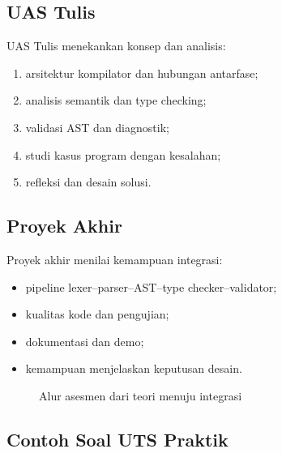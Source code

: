 \subsection{UAS Tulis}

UAS Tulis menekankan konsep dan analisis:
\begin{enumerate}[label=\arabic*.,leftmargin=*]
  \item arsitektur kompilator dan hubungan antarfase;
  \item analisis semantik dan type checking;
  \item validasi AST dan diagnostik;
  \item studi kasus program dengan kesalahan;
  \item refleksi dan desain solusi.
\end{enumerate}

\subsection{Proyek Akhir}

Proyek akhir menilai kemampuan integrasi:
\begin{itemize}[leftmargin=*]
  \item pipeline lexer--parser--AST--type checker--validator;
  \item kualitas kode dan pengujian;
  \item dokumentasi dan demo;
  \item kemampuan menjelaskan keputusan desain.
\end{itemize}

\begin{figure}[H]
\centering
{}
\caption{Alur asesmen dari teori menuju integrasi}
\label{fig:ch17-alur}
\end{figure}

\subsection{Contoh Soal UTS Praktik}

